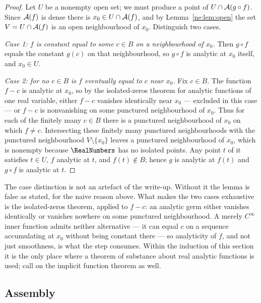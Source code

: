 \begin{proof}
Let $U$ be a nonempty open set; we must produce a point of $U\cap\mathcal A(g\circ
f)$.  Since $\mathcal A(f)$ is dense there is $x_0\in U\cap\mathcal A(f)$, and by
Lemma~\ref{ne:lem:open} the set $V=U\cap\mathcal A(f)$ is an open neighbourhood of $x_0$.
Distinguish two cases.

\emph{Case 1: $f$ is constant equal to some $c\in B$ on a neighbourhood of
$x_0$.}  Then $g\circ f$ equals the constant $g(c)$ on that neighbourhood, so
$g\circ f$ is analytic at $x_0$ itself, and $x_0\in U$.

\emph{Case 2: for no $c\in B$ is $f$ eventually equal to $c$ near $x_0$.}  Fix
$c\in B$.  The function $f-c$ is analytic at $x_0$, so by the isolated-zeros
theorem for analytic functions of one real variable, either $f-c$ vanishes
identically near $x_0$ --- excluded in this case --- or $f-c$ is nonvanishing
on some punctured neighbourhood of $x_0$.  Thus for each of the finitely many
$c\in B$ there is a punctured neighbourhood of $x_0$ on which $f\ne c$.
Intersecting these finitely many punctured neighbourhoods with the punctured
neighbourhood $V\setminus\{x_0\}$ leaves a punctured neighbourhood of $x_0$,
which is nonempty because $\RealNumbers$ has no isolated points.  Any point $t$ of it
satisfies $t\in U$, $f$ analytic at $t$, and $f(t)\notin B$; hence $g$ is
analytic at $f(t)$ and $g\circ f$ is analytic at $t$.
\end{proof}

\begin{remark}
The case distinction is not an artefact of the write-up.  Without it the lemma
is false as stated, for the naive reason above.  What makes the two cases
exhaustive is the isolated-zeros theorem, applied to $f-c$: an analytic germ
either vanishes identically or vanishes nowhere on some punctured
neighbourhood.  A merely $C^\infty$ inner function admits neither
alternative --- it can equal $c$ on a sequence accumulating at $x_0$ without
being constant there --- so analyticity of $f$, and not just smoothness, is
what the step consumes.  Within the induction of this section it is the only
place where a theorem of substance about real analytic functions is used;
 call on the implicit function theorem as
well.
\end{remark}

\subsection{Assembly}


